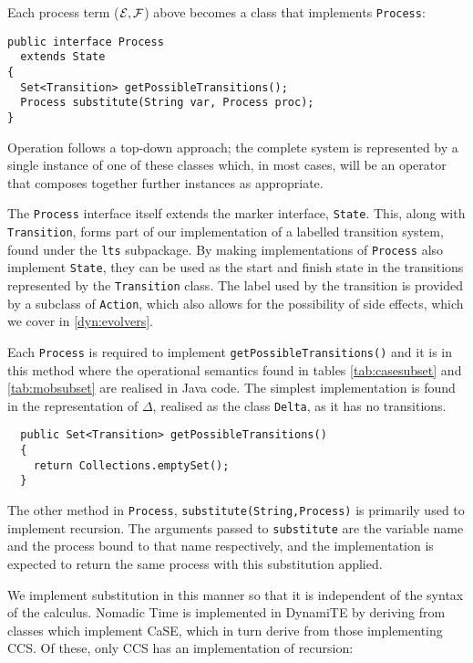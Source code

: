 Each process term ($\text{$\mathcal{E}$}, \text{$\mathcal{F}$}$) above becomes a class that implements \texttt{Process}:

\begin{verbatim}
public interface Process
  extends State
{
  Set<Transition> getPossibleTransitions();
  Process substitute(String var, Process proc);
}
\end{verbatim}

Operation follows a top-down approach; the complete system is
represented by a single instance of one of these classes which, in
most cases, will be an operator that composes together further
instances as appropriate.

The \texttt{Process} interface itself extends the marker interface,
\texttt{State}.  This, along with \texttt{Transition}, forms part of
our implementation of a labelled transition system, found under the
\texttt{lts} subpackage.  By making implementations of
\texttt{Process} also implement \texttt{State}, they can be used as
the start and finish state in the transitions represented by the
\texttt{Transition} class.  The label used by the transition is
provided by a subclass of \texttt{Action}, which also allows for the
possibility of side effects, which we cover in \ref{dyn:evolvers}.

Each \texttt{Process} is required to implement
\texttt{getPossibleTransitions()} and it is in this method where the
operational semantics found in tables \ref{tab:casesubset} and
\ref{tab:mobsubset} are realised in Java code.  The simplest
implementation is found in the representation of $\Delta$, realised as
the class \texttt{Delta}, as it has no transitions.

\begin{verbatim}
  public Set<Transition> getPossibleTransitions()
  {
    return Collections.emptySet();
  }
\end{verbatim}

The other method in \texttt{Process},
\texttt{substitute(String,Process)} is primarily used to implement
recursion.  The arguments passed to \texttt{substitute} are the
variable name and the process bound to that name respectively, and the
implementation is expected to return the same process with this
substitution applied.

We implement substitution in this manner so that it is independent of
the syntax of the calculus.  Nomadic Time is implemented in DynamiTE
by deriving from classes which implement CaSE, which in turn derive
from those implementing CCS.  Of these, only CCS has an implementation
of recursion:

